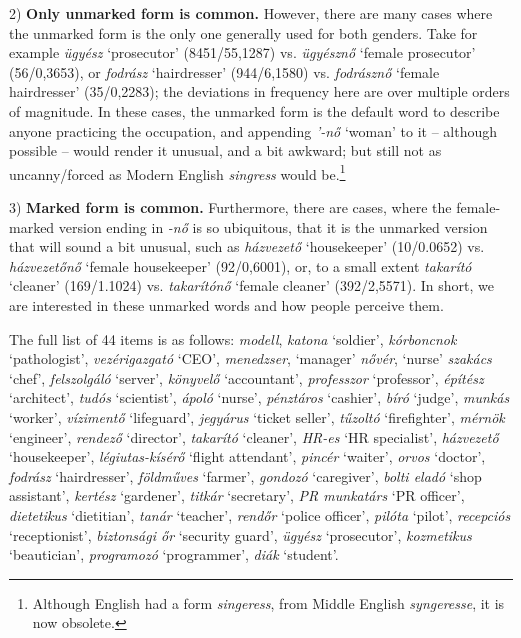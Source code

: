 \documentclass[11pt]{article}
\begin{document}
2) \textbf{Only unmarked form is common.} However, there are many cases where the unmarked form is the only one generally used for both genders. Take for example \textit{ügyész} `prosecutor' (8451/55,1287) vs. \textit{ügyésznő} `female prosecutor' (56/0,3653), or \textit{fodrász} `hairdresser' (944/6,1580) vs. \textit{fodrásznő} `female hairdresser' (35/0,2283); the deviations in frequency here are over multiple orders of magnitude. In these cases, the unmarked form is the default word to describe anyone practicing the occupation, and appending \textit{'-nő} `woman' to it -- although possible -- would render it unusual, and a bit awkward; but still not as uncanny/forced as Modern English \textit{singress} would be.\footnote{Although English had a form \textit{singeress}, from Middle English \textit{syngeresse}, it is now obsolete.}


3) \textbf{Marked form is common.} Furthermore, there are cases, where the female-marked version ending in \textit{-nő} is so ubiquitous, that it is the unmarked version that will sound a bit unusual, such as \textit{házvezető} `housekeeper' (10/0.0652) vs. \textit{házvezetőnő} `female housekeeper' (92/0,6001), or, to a small extent \textit{takarító} `cleaner' (169/1.1024) vs. \textit{takarítónő} `female cleaner' (392/2,5571). In short, we are interested in these unmarked words and how people perceive them.

The full list of 44 items is as follows: \textit{modell}, \textit{katona} `soldier', \textit{kórboncnok} `pathologist', \textit{vezérigazgató} `CEO', \textit{menedzser}, `manager' \textit{nővér}, `nurse' \textit{szakács} `chef', \textit{felszolgáló} `server', \textit{könyvelő} `accountant', \textit{professzor} `professor', \textit{építész} `architect', \textit{tudós} `scientist', \textit{ápoló} `nurse', \textit{pénztáros} `cashier', \textit{bíró} `judge', \textit{munkás} `worker', \textit{vízimentő} `lifeguard', \textit{jegyárus} `ticket seller', \textit{tűzoltó} `firefighter', \textit{mérnök} `engineer', \textit{rendező} `director', \textit{takarító} `cleaner', \textit{HR-es} `HR specialist', \textit{házvezető} `housekeeper', \textit{légiutas-kísérő} `flight attendant', \textit{pincér} `waiter', \textit{orvos} `doctor', \textit{fodrász} `hairdresser', \textit{földműves} `farmer', \textit{gondozó} `caregiver', \textit{bolti eladó} `shop assistant', \textit{kertész} `gardener', \textit{titkár} `secretary', \textit{PR munkatárs} `PR officer', \textit{dietetikus} `dietitian', \textit{tanár} `teacher', \textit{rendőr} `police officer', \textit{pilóta} `pilot', \textit{recepciós} `receptionist', \textit{biztonsági őr} `security guard', \textit{ügyész} `prosecutor', \textit{kozmetikus} `beautician', \textit{programozó} `programmer', \textit{diák} `student'.
\end{document}

